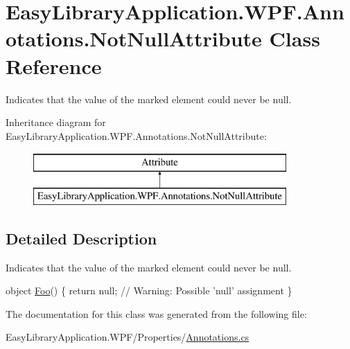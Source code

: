 \hypertarget{class_easy_library_application_1_1_w_p_f_1_1_annotations_1_1_not_null_attribute}{}\section{Easy\+Library\+Application.\+W\+P\+F.\+Annotations.\+Not\+Null\+Attribute Class Reference}
\label{class_easy_library_application_1_1_w_p_f_1_1_annotations_1_1_not_null_attribute}


Indicates that the value of the marked element could never be {\ttfamily null}.  


Inheritance diagram for Easy\+Library\+Application.\+W\+P\+F.\+Annotations.\+Not\+Null\+Attribute\+:\begin{figure}[H]
\begin{center}
\leavevmode
\includegraphics[height=2.000000cm]{class_easy_library_application_1_1_w_p_f_1_1_annotations_1_1_not_null_attribute}
\end{center}
\end{figure}


\subsection{Detailed Description}
Indicates that the value of the marked element could never be {\ttfamily null}. 


\begin{DoxyCode}
[NotNull] \textcolor{keywordtype}{object} \mbox{\hyperlink{_annotations_8cs_a710c2378b43f44cd4a9b365c85be5d6c}{Foo}}() \{
  \textcolor{keywordflow}{return} null; \textcolor{comment}{// Warning: Possible 'null' assignment}
\}
\end{DoxyCode}


The documentation for this class was generated from the following file\+:\begin{DoxyCompactItemize}
\item 
Easy\+Library\+Application.\+W\+P\+F/\+Properties/\mbox{\hyperlink{_annotations_8cs}{Annotations.\+cs}}\end{DoxyCompactItemize}
